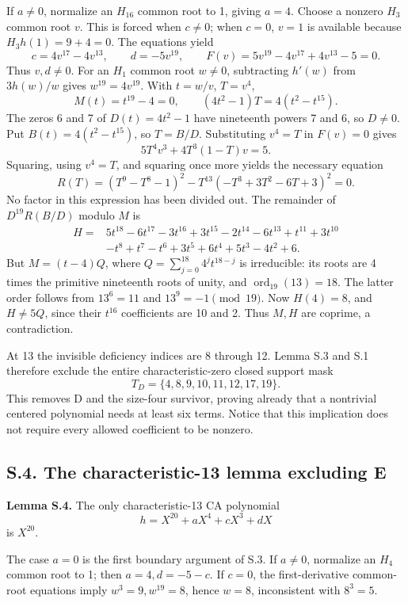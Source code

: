 \documentclass[
  british,
  10pt,
]{article}
\begin{document}
If \(a\ne0\), normalize an \(H_{16}\) common root to 1, giving \(a=4\).
Choose a nonzero \(H_3\) common root \(v\). This is forced when
\(c\ne0\); when \(c=0\), \(v=1\) is available because \(H_3h(1)=9+4=0\).
The equations yield \[
c=4v^{17}-4v^{13},\qquad d=-5v^{19},
\qquad F(v)=5v^{19}-4v^{17}+4v^{13}-5=0.
\] Thus \(v,d\ne0\). For an \(H_1\) common root \(w\ne0\), subtracting
\(h'(w)\) from \(3h(w)/w\) gives \(w^{19}=4v^{19}\). With \(t=w/v\),
\(T=v^4\), \[
M(t)=t^{19}-4=0,\qquad
(4t^2-1)T=4(t^2-t^{15}).
\] The zeros 6 and 7 of \(D(t)=4t^2-1\) have nineteenth powers 7 and 6,
so \(D\ne0\). Put \(B(t)=4(t^2-t^{15})\), so \(T=B/D\). Substituting
\(v^4=T\) in \(F(v)=0\) gives \[
5T^4v^3+4T^3(1-T)v=5.
\] Squaring, using \(v^4=T\), and squaring once more yields the
necessary equation \[
R(T)=(T^9-T^8-1)^2-T^{13}(-T^3+3T^2-6T+3)^2=0.
\] No factor in this expression has been divided out. The remainder of
\(D^{19}R(B/D)\) modulo \(M\) is \[
\begin{aligned}
H={}&5t^{18}-6t^{17}-3t^{16}+3t^{15}-2t^{14}-6t^{13}
+t^{11}+3t^{10}\\
&-t^8+t^7-t^6+3t^5+6t^4+5t^3-4t^2+6.
\end{aligned}
\tag{S6}
\] But \(M=(t-4)Q\), where \(Q=\sum_{j=0}^{18}4^jt^{18-j}\) is
irreducible: its roots are 4 times the primitive nineteenth roots of
unity, and \(\operatorname{ord}_{19}(13)=18\). The latter order follows
from \(13^6=11\) and \(13^9=-1\pmod{19}\). Now \(H(4)=8\), and
\(H\ne5Q\), since their \(t^{16}\) coefficients are 10 and 2. Thus
\(M,H\) are coprime, a contradiction.

At 13 the invisible deficiency indices are 8 through 12. Lemma S.3 and
S.1 therefore exclude the entire characteristic-zero closed support mask
\[
T_D=\{4,8,9,10,11,12,17,19\}.
\tag{S7}
\] This removes D and the size-four survivor, proving already that a
nontrivial centered polynomial needs at least six terms. Notice that
this implication does not require every allowed coefficient to be
nonzero.

\subsection{S.4. The characteristic-13 lemma excluding
E}\label{s.4.-the-characteristic-13-lemma-excluding-e}

\textbf{Lemma S.4.} The only characteristic-13 CA polynomial \[
h=X^{20}+aX^4+cX^3+dX
\] is \(X^{20}\).

The case \(a=0\) is the first boundary argument of S.3. If \(a\ne0\),
normalize an \(H_4\) common root to 1; then \(a=4,d=-5-c\). If \(c=0\),
the first-derivative common-root equations imply \(w^3=9,w^{19}=8\),
hence \(w=8\), inconsistent with \(8^3=5\).
\end{document}
